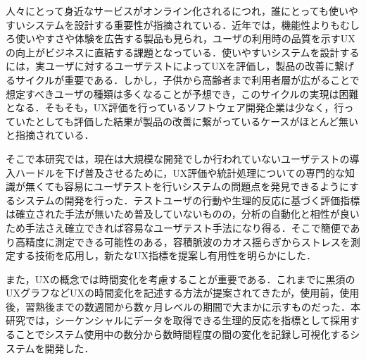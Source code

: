 
\begin{jabstract}

人々にとって身近なサービスがオンライン化されるにつれ，誰にとっても使いやすいシステムを設計する重要性が指摘されている．近年では，機能性よりもむしろ使いやすさや体験を広告する製品も見られ，ユーザの利用時の品質を示すUXの向上がビジネスに直結する課題となっている．使いやすいシステムを設計するには，実ユーザに対するユーザテストによってUXを評価し，製品の改善に繋げるサイクルが重要である．しかし，子供から高齢者まで利用者層が広がることで想定すべきユーザの種類は多くなることが予想でき，このサイクルの実現は困難となる．そもそも，UX評価を行っているソフトウェア開発企業は少なく，行っていたとしても評価した結果が製品の改善に繋がっているケースがほとんど無いと指摘されている．

そこで本研究では，現在は大規模な開発でしか行われていないユーザテストの導入ハードルを下げ普及させるために，UX評価や統計処理についての専門的な知識が無くても容易にユーザテストを行いシステムの問題点を発見できるようにするシステムの開発を行った．テストユーザの行動や生理的反応に基づく評価指標は確立された手法が無いため普及していないものの，分析の自動化と相性が良いため手法さえ確立できれば容易なユーザテスト手法になり得る．そこで簡便であり高精度に測定できる可能性のある，容積脈波のカオス揺らぎからストレスを測定する技術を応用し，新たなUX指標を提案し有用性を明らかにした．

また，UXの概念では時間変化を考慮することが重要である．これまでに黒須のUXグラフなどUXの時間変化を記述する方法が提案されてきたが，使用前，使用後，習熟後までの数週間から数ヶ月レベルの期間で大まかに示すものだった．本研究では，シーケンシャルにデータを取得できる生理的反応を指標として採用することでシステム使用中の数分から数時間程度の間の変化を記録し可視化するシステムを開発した．

\end{jabstract}


